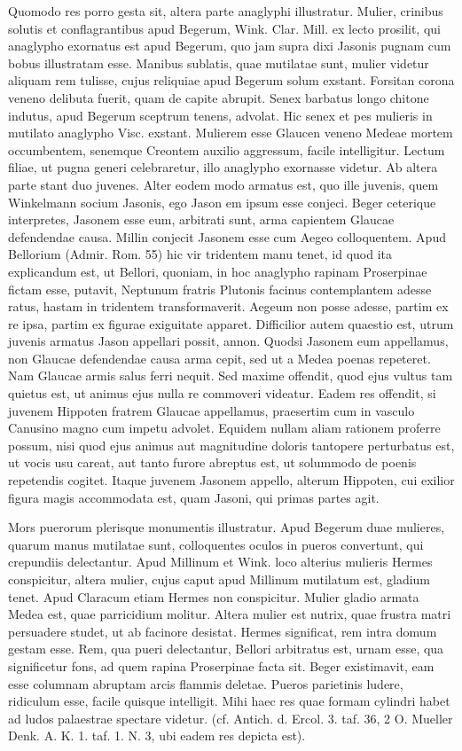 \documentclass[landscape, a4paper, 11pt, oneside, polutonikogreek, german]{article}
\begin{document}
Quomodo res porro gesta sit, altera parte anaglyphi illustratur. Mulier, crinibus solutis et conflagrantibus apud Begerum, Wink. Clar. Mill. ex lecto prosilit, qui anaglypho exornatus est apud Begerum, quo jam supra dixi Jasonis pugnam cum bobus illustratam esse. Manibus sublatis, quae mutilatae sunt, mulier videtur aliquam rem tulisse, cujus reliquiae apud Begerum solum exstant. Forsitan corona veneno delibuta fuerit, quam de capite abrupit. Senex barbatus longo chitone indutus, apud Begerum sceptrum tenens, advolat. Hic senex et pes mulieris in mutilato anaglypho Visc. exstant. Mulierem esse Glaucen veneno Medeae mortem occumbentem, senemque Creontem auxilio aggressum, facile intelligitur. Lectum filiae, ut pugna generi celebraretur, illo anaglypho exornasse videtur. Ab altera parte stant duo juvenes. Alter eodem modo armatus est, quo ille juvenis, quem Winkelmann socium Jasonis, ego Jason em ipsum esse conjeci. Beger ceterique interpretes, Jasonem esse eum, arbitrati sunt, arma capientem Glaucae defendendae causa. Millin conjecit Jasonem esse cum Aegeo colloquentem. Apud Bellorium (Admir. Rom. 55) hic vir tridentem manu tenet, id quod ita explicandum est, ut Bellori, quoniam, in hoc anaglypho rapinam Proserpinae fictam esse, putavit, Neptunum fratris Plutonis facinus contemplantem adesse ratus, hastam in tridentem transformaverit. Aegeum non posse adesse, partim ex re ipsa, partim ex figurae exiguitate apparet. Difficilior autem quaestio est, utrum juvenis armatus Jason appellari possit, annon. Quodsi Jasonem eum appellamus, non Glaucae defendendae causa arma cepit, sed ut a Medea poenas repeteret. Nam Glaucae armis salus ferri nequit. Sed maxime offendit, quod ejus vultus tam quietus est, ut animus ejus nulla re commoveri videatur. Eadem res offendit, si juvenem Hippoten fratrem Glaucae appellamus, praesertim cum in vasculo Canusino magno cum impetu advolet. Equidem nullam aliam rationem proferre possum, nisi quod ejus animus aut magnitudine doloris tantopere perturbatus est, ut vocis usu careat, aut tanto furore abreptus est, ut solummodo de poenis repetendis cogitet. Itaque juvenem Jasonem appello, alterum Hippoten, cui exilior figura magis accommodata est, quam Jasoni, qui primas partes agit.

Mors puerorum plerisque monumentis illustratur. Apud Begerum duae mulieres, quarum manus mutilatae sunt, colloquentes oculos in pueros convertunt, qui crepundiis delectantur. Apud Millinum et Wink. loco alterius mulieris Hermes conspicitur, altera mulier, cujus caput apud Millinum mutilatum est, gladium tenet. Apud Claracum etiam Hermes non conspicitur. Mulier gladio armata Medea est, quae parricidium molitur. Altera mulier est nutrix, quae frustra matri persuadere studet, ut ab facinore desistat. Hermes significat, rem intra domum gestam esse. Rem, qua pueri delectantur, Bellori arbitratus est, urnam esse, qua significetur fons, ad quem rapina Proserpinae facta sit. Beger existimavit, eam esse columnam abruptam arcis flammis deletae. Pueros parietinis ludere, ridiculum esse, facile quisque intelligit. Mihi haec res quae formam cylindri habet ad ludos palaestrae spectare videtur. (cf. Antich. d. Ercol. 3. taf. 36, 2 O. Mueller Denk. A. K. 1. taf. 1. N. 3, ubi eadem res depicta est).
\end{document}
